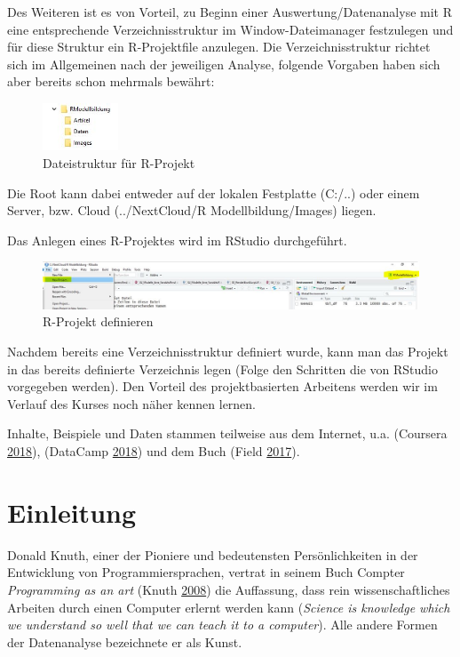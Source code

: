 \documentclass[]{article}
\begin{document}
Des Weiteren ist es von Vorteil, zu Beginn einer Auswertung/Datenanalyse
mit R eine entsprechende Verzeichnisstruktur im Window-Dateimanager
festzulegen und für diese Struktur ein R-Projektfile anzulegen. Die
Verzeichnisstruktur richtet sich im Allgemeinen nach der jeweiligen
Analyse, folgende Vorgaben haben sich aber bereits schon mehrmals
bewährt:

\begin{figure}
\centering
\includegraphics[width=0.20000\textwidth]{Images/Verzeichnisstruktur.JPG}
\caption{Dateistruktur für R-Projekt}
\end{figure}

Die Root kann dabei entweder auf der lokalen Festplatte (C:/..) oder
einem Server, bzw. Cloud (../NextCloud/R Modellbildung/Images) liegen.

Das Anlegen eines R-Projektes wird im RStudio durchgeführt.

\begin{figure}
\centering
\includegraphics[width=1.00000\textwidth]{Images/Projektdefinieren.JPG}
\caption{R-Projekt definieren}
\end{figure}

Nachdem bereits eine Verzeichnisstruktur definiert wurde, kann man das
Projekt in das bereits definierte Verzeichnis legen (Folge den Schritten
die von RStudio vorgegeben werden). Den Vorteil des projektbasierten
Arbeitens werden wir im Verlauf des Kurses noch näher kennen lernen.

Inhalte, Beispiele und Daten stammen teilweise aus dem Internet, u.a.
(Coursera \protect\hyperlink{ref-CourseRa}{2018}), (DataCamp
\protect\hyperlink{ref-DataCamp}{2018}) und dem Buch (Field
\protect\hyperlink{ref-Field}{2017}).

\section*{Einleitung}\label{einleitung}

Donald Knuth, einer der Pioniere und bedeutensten Persönlichkeiten in
der Entwicklung von Programmiersprachen, vertrat in seinem Buch Compter
\emph{Programming as an art} (Knuth \protect\hyperlink{ref-Knuth}{2008})
die Auffassung, dass rein wissenschaftliches Arbeiten durch einen
Computer erlernt werden kann (\emph{Science is knowledge which we
understand so well that we can teach it to a computer}). Alle andere
Formen der Datenanalyse bezeichnete er als Kunst.
\end{document}
